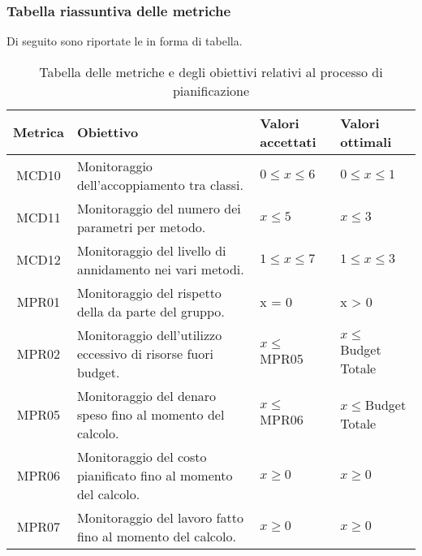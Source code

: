 \subsubsection{Tabella riassuntiva delle metriche}%
Di seguito sono riportate le  in forma di tabella.
\begin{table}[H]
		\begin{center}
			\setlength{\aboverulesep}{0pt}
			\setlength{\belowrulesep}{0pt}
			\setlength{\extrarowheight}{.75ex}
			\begin{tabular}{ c C{6cm} C{3cm} C{3cm} }
				\textbf{Metrica} & \textbf{Obiettivo} & \textbf{Valori accettati} & \textbf{Valori ottimali}  \\
				\toprule
				MCD10 & Monitoraggio dell'accoppiamento tra classi. & $ 0 \leq x \leq 6$ & $ 0 \leq x \leq 1$  \\
				MCD11 & Monitoraggio del numero dei parametri per metodo. & $x \leq 5$ & $x \leq 3 $\\ 
				MCD12 & Monitoraggio del livello di annidamento nei vari metodi. & $1 \leq x \leq 7 $ & $1 \leq x \leq 3$ \\	
				
				MPR01 & Monitoraggio del rispetto della  da parte del gruppo. \gruppo{} & x = 0 & x > 0 \\
				
				MPR02 & Monitoraggio dell'utilizzo eccessivo di risorse fuori budget. & $ x \leq$ MPR05 & $ x \leq$ Budget Totale \\
				
				MPR05 & Monitoraggio del denaro speso fino al momento del calcolo. & $ x \leq $ MPR06 & $x \leq $Budget Totale  \\
				
				MPR06 & Monitoraggio del costo pianificato fino al momento del calcolo. & $ x \geq 0$ & $x \geq 0$\\
				
				MPR07	& Monitoraggio del lavoro fatto fino al momento del calcolo. & $ x \geq 0 $ & $ x \geq 0 $ \\			
				

				\bottomrule
			\end{tabular}
			\caption{Tabella delle metriche e degli obiettivi relativi al processo di pianificazione}
		\end{center}
	\end{table}



